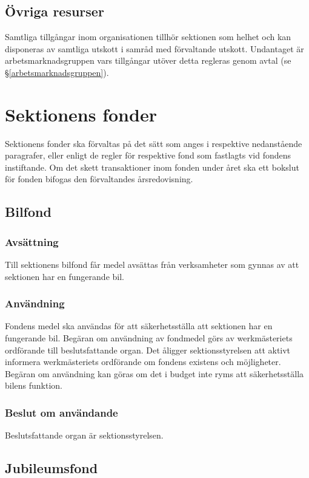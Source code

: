 \documentclass{datateknologsektionen-document}
\begin{document}
\subsection{Övriga resurser}
Samtliga tillgångar inom organisationen tillhör sektionen som helhet och kan disponeras
av samtliga utskott i samråd med förvaltande utskott. Undantaget är arbetsmarknadsgruppen
vars tillgångar utöver detta regleras genom avtal (se \S \ref{arbetsmarknadsgruppen}).

\section{Sektionens fonder}
\label{fonder}
Sektionens fonder ska förvaltas på det sätt som anges i respektive nedanstående paragrafer, eller
enligt de regler för respektive fond som fastlagts vid fondens instiftande. Om det skett
transaktioner inom fonden under året ska ett bokslut för fonden bifogas den förvaltandes
årsredovisning.

\subsection{Bilfond}
\subsubsection{Avsättning}
Till sektionens bilfond får medel avsättas från verksamheter som gynnas av att sektionen har en
fungerande bil.

\subsubsection{Användning}
Fondens medel ska användas för att säkerhetsställa att sektionen har en fungerande bil.
Begäran om användning av fondmedel görs av werkmästeriets ordförande till beslutsfattande
organ. Det åligger sektionsstyrelsen att aktivt informera werkmästeriets ordförande om
fondens existens och möjligheter. Begäran om användning kan göras om det i budget inte
ryms att säkerhetsställa bilens funktion.

\subsubsection{Beslut om användande}
Beslutsfattande organ är sektionsstyrelsen.

\subsection{Jubileumsfond}
\end{document}
